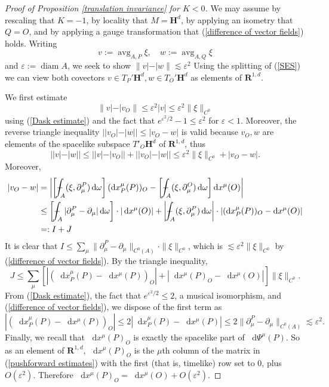 \documentclass[reqno,11pt]{amsart}
\newcommand{\RR}{\mathbf{R}}
\newcommand{\Hyp}{\mathbf H}
\DeclareMathOperator{\avg}{avg}
\DeclareMathOperator{\diam}{diam}
\newcommand*\dif{\mathop{}\!\mathrm{d}}
\theoremstyle{definition}
\numberwithin{equation}{section}
\def\Xint#1{\mathchoice
{\XXint\displaystyle\textstyle{#1}}%
{\XXint\textstyle\scriptstyle{#1}}%
{\XXint\scriptstyle\scriptscriptstyle{#1}}%
{\XXint\scriptscriptstyle\scriptscriptstyle{#1}}%
\!\int}
\def\XXint#1#2#3{{\setbox0=\hbox{$#1{#2#3}{\int}$ }
\vcenter{\hbox{$#2#3$ }}\kern-.6\wd0}}
\def\dashint{\Xint-}
\begin{document}
\begin{proof}[Proof of Proposition \ref{translation invariance} for $K < 0$]
We may assume by rescaling that $K = -1$, by locality that $M = \Hyp^d$, by applying an isometry that $Q = O$, and by applying a gauge transformation that (\ref{difference of vector fields}) holds.
Writing
$$v := \avg_{A, P} \xi, \quad w := \avg_{A, Q} \xi$$
and $\varepsilon := \diam A$, we seek to show $\|v| - |w\| \lesssim \varepsilon^2$
Using the splitting of (\ref{SES}) we can view both covectors $v \in T_P' \Hyp^d, w \in T_O' \Hyp^d$ as elements of $\RR^{1, d}$.

We first estimate
$$\|v| - |v_O\| \leq \varepsilon^2 |v| \leq \varepsilon^2 \|\xi\|_{C^0}$$
using (\ref{Dask estimate}) and the fact that $e^{\varepsilon^2/2} - 1 \leq \varepsilon^2$ for $\varepsilon < 1$.
Moreover, the reverse triangle inequality $||v_O| - |w|| \leq |v_O - w|$ is valid because $v_O, w$ are elements of the spacelike subspace $T'_O \Hyp^d$ of $\RR^{1, d}$, thus
$$||v| - |w|| \leq ||v| - |v_O|| + ||v_O| - |w|| \leq \varepsilon^2 \|\xi\|_{C^0} + |v_O - w|.$$
Moreover,
\begin{align*}
|v_O - w| &= \left|\left[\dashint_A (\xi, \partial^P_\mu) \dif \omega\right] (\dif x_P^\mu(P))_O - \left[\dashint_A (\xi, \partial^O_\mu) \dif \omega\right] \dif x^\mu(O)\right| \\
&\leq \left[\dashint_A |\partial^P_\mu - \partial_\mu| \dif \omega\right] \cdot |\dif x^\mu(O)| + \left|\dashint_A (\xi, \partial_\mu^P) \dif \omega\right| \cdot |(\dif x^\mu_P(P))_O - \dif x^\mu(O)|\\
&=: I + J
\end{align*}
It is clear that $I \leq \sum_\mu \|\partial^P_\mu - \partial_\mu\|_{C^0(A)} \cdot \|\xi\|_{C^0}$, which is $\lesssim \varepsilon^2 \|\xi\|_{C^0}$ by (\ref{difference of vector fields}).
By the triangle inequality,
$$J \leq \sum_\mu \left[|(\dif x^\mu_P(P) - \dif x^\mu(P))_O| + |\dif x^\mu(P)_O - \dif x^\mu(O)|\right] \|\xi\|_{C^0}.$$
From (\ref{Dask estimate}), the fact that $e^{\varepsilon^2/2} \leq 2$, a musical isomorphism, and (\ref{difference of vector fields}), we dispose of the first term as
$$|(\dif x^\mu_P(P) - \dif x^\mu(P))_O| \leq 2 |\dif x^\mu_P(P) - \dif x^\mu(P)| \leq 2 \|\partial^P_\mu - \partial_\mu\|_{C^0(A)} \lesssim \varepsilon^2.$$
Finally, we recall that $\dif x^\mu(P)_O$ is exactly the spacelike part of $\dif \Psi^\mu(P)$.
So as an element of $\RR^{1, d}$, $\dif x^\mu(P)_O$ is the $\mu$th column of the matrix in (\ref{pushforward estimates}) with the first (that is, timelike) row set to $0$, plus $O(\varepsilon^2)$.
Therefore $\dif x^\mu(P)_O = \dif x^\mu(O) + O(\varepsilon^2)$.
\end{proof}
\end{document}
